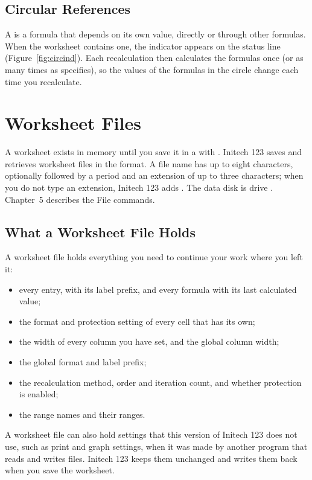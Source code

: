 \subsection{Circular References}
A  is a formula that depends on its own value,
directly or through other formulas.  When the worksheet contains one, the
 indicator appears on the status line (Figure~\ref{fig:circind}).
Each recalculation then calculates the formulas once (or as many times as
 specifies), so the
values of the formulas in the circle change each time you recalculate.


\section{Worksheet Files}
A worksheet exists in memory until you save it in a 
with .  Initech 123 saves and retrieves worksheet
files in the  format.  A file name has up to eight characters,
optionally followed by a period and an extension of up to three characters;
when you do not type an extension, Initech 123 adds .  The data
disk is drive .  Chapter~5 describes the File commands.

\subsection{What a Worksheet File Holds}
A worksheet file holds everything you need to continue your work where you
left it:
\begin{itemize}
\item every entry, with its label prefix, and every formula with its last
  calculated value;
\item the format and protection setting of every cell that has its own;
\item the width of every column you have set, and the global column width;
\item the global format and label prefix;
\item the recalculation method, order and iteration count, and whether
  protection is enabled;
\item the range names and their ranges.
\end{itemize}
A worksheet file can also hold settings that this version of Initech 123
does not use, such as print and graph settings, when it was made by
another program that reads and writes  files.  Initech 123
keeps them unchanged and writes them back when you save the worksheet.
